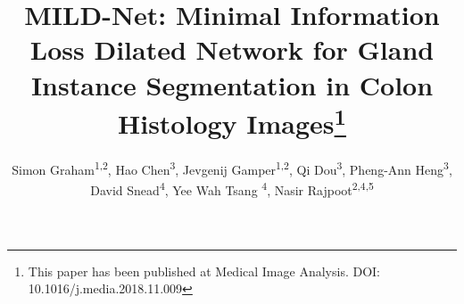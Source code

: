 \documentclass[3p]{elsarticle}
\begin{document}
\begin{frontmatter}


\title{MILD-Net: Minimal Information Loss Dilated Network for Gland Instance Segmentation in Colon Histology Images\footnote[1]{This paper has been published at Medical Image Analysis. DOI: 10.1016/j.media.2018.11.009}}




\author{Simon Graham\textsuperscript{1,2}, Hao Chen\textsuperscript{3}, Jevgenij Gamper\textsuperscript{1,2}, Qi Dou\textsuperscript{3}, Pheng-Ann Heng\textsuperscript{3}, David Snead\textsuperscript{4}, Yee Wah Tsang \textsuperscript{4}, Nasir Rajpoot\textsuperscript{2,4,5}}

\address{\textsuperscript{1}Mathematics for Real World Systems Centre for Doctoral Training, University of Warwick, UK \\
\textsuperscript{2}Department of Computer Science, University of Warwick, UK \\
\textsuperscript{3}Department of Computer Science and Engineering, The Chinese University of Hong Kong, China \\
\textsuperscript{4}Department of Pathology, University Hospitals Coventry and Warwickshire, Coventry, UK \\
\textsuperscript{5}The Alan Turing Institute, London, UK}

\begin{abstract}


\end{abstract}
\end{frontmatter}
\end{document}
